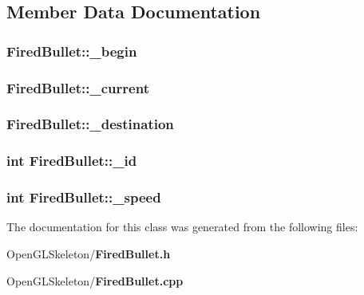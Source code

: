 \subsection{Member Data Documentation}
\subsubsection[{\+\_\+begin}]{ Fired\+Bullet\+::\+\_\+begin}\label{class_fired_bullet_ad375a79880642a62919962703d517647}
\subsubsection[{\+\_\+current}]{ Fired\+Bullet\+::\+\_\+current}\label{class_fired_bullet_a6dd6875fc874a58132ecd2972c382889}
\subsubsection[{\+\_\+destination}]{ Fired\+Bullet\+::\+\_\+destination}\label{class_fired_bullet_a288c5a49e15534f75c3ec5fde81dfa28}
\subsubsection[{\+\_\+id}]{\setlength{\rightskip}{0pt plus 5cm}int Fired\+Bullet\+::\+\_\+id}\label{class_fired_bullet_aec3fb0f356070b8dfa295b771f8afb2e}
\subsubsection[{\+\_\+speed}]{\setlength{\rightskip}{0pt plus 5cm}int Fired\+Bullet\+::\+\_\+speed}\label{class_fired_bullet_a740fdbda74e1c585cc1771d56d2a9807}


The documentation for this class was generated from the following files\+:\begin{DoxyCompactItemize}
\item 
Open\+G\+L\+Skeleton/{\bf Fired\+Bullet.\+h}\item 
Open\+G\+L\+Skeleton/{\bf Fired\+Bullet.\+cpp}\end{DoxyCompactItemize}
